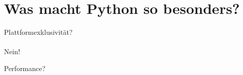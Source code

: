 \documentclass{beamer}
\begin{document}
{
  \begin{frame}[plain]
  \end{frame}
}

\section{Was macht Python so besonders?}

\begin{frame}
\begin{center}
{ \Huge Plattformexklusivität?}\\~\\
\pause
Nein!
\end{center}
\end{frame}

\begin{frame}
\begin{center}
{ \Huge Performance?}
\end{center}
\end{frame}
\end{document}

